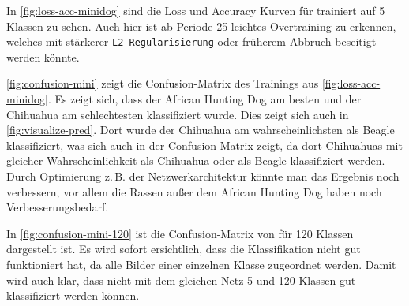 In \autoref{fig:loss-acc-minidog} sind die Loss und Accuracy Kurven für \MiniDog{}
trainiert auf 5 Klassen zu sehen. Auch hier ist ab Periode 25 leichtes
Overtraining zu erkennen, welches mit stärkerer \texttt{L2-Regularisierung} oder
früherem Abbruch beseitigt werden könnte.

\autoref{fig:confusion-mini} zeigt die Confusion-Matrix des Trainings aus
\autoref{fig:loss-acc-minidog}. Es zeigt sich, dass der African Hunting Dog am
besten und der Chihuahua am schlechtesten klassifiziert wurde. Dies zeigt sich
auch in \autoref{fig:visualize-pred}. Dort wurde der Chihuahua am
wahrscheinlichsten als Beagle klassifiziert, was sich auch in der
Confusion-Matrix zeigt, da dort Chihuahuas mit gleicher Wahrscheinlichkeit als
Chihuahua oder als Beagle klassifiziert werden. Durch Optimierung z.\,B. der
Netzwerkarchitektur könnte man das Ergebnis noch verbessern, vor allem die Rassen
außer dem African Hunting Dog haben noch Verbesserungsbedarf.

In \autoref{fig:confusion-mini-120} ist die Confusion-Matrix von \MiniDog{} für
120 Klassen dargestellt ist. Es wird sofort ersichtlich, dass die Klassifikation
nicht gut funktioniert hat, da alle Bilder einer einzelnen Klasse zugeordnet
werden. Damit wird auch klar, dass nicht mit dem gleichen Netz 5 und 120 Klassen
gut klassifiziert werden können.

